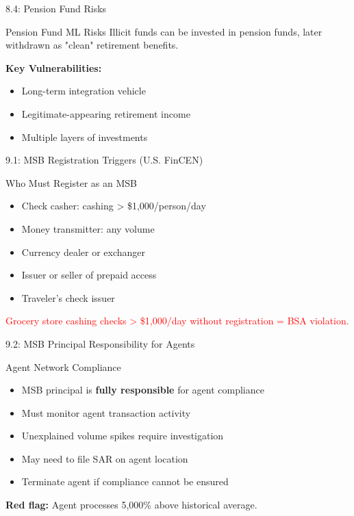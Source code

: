 \documentclass{beamer}
\begin{document}
	\begin{frame}{8.4: Pension Fund Risks}
		\begin{block}{Pension Fund ML Risks}
			Illicit funds can be invested in pension funds, later withdrawn as "clean" retirement benefits.
		\end{block}
		\textbf{Key Vulnerabilities:}
		\begin{itemize}
			\item Long-term integration vehicle
			\item Legitimate-appearing retirement income
			\item Multiple layers of investments
		\end{itemize}
	\end{frame}
	
	
	\begin{frame}{9.1: MSB Registration Triggers (U.S. FinCEN)}
		\begin{block}{Who Must Register as an MSB}
			\begin{itemize}
				\item Check casher: cashing > \$1,000/person/day
				\item Money transmitter: any volume
				\item Currency dealer or exchanger
				\item Issuer or seller of prepaid access
				\item Traveler's check issuer
			\end{itemize}
		\end{block}
		\textcolor{red}{Grocery store cashing checks > \$1,000/day without registration = BSA violation.}
	\end{frame}
	
	\begin{frame}{9.2: MSB Principal Responsibility for Agents}
		\begin{block}{Agent Network Compliance}
			\begin{itemize}
				\item MSB principal is \textbf{fully responsible} for agent compliance
				\item Must monitor agent transaction activity
				\item Unexplained volume spikes require investigation
				\item May need to file SAR on agent location
				\item Terminate agent if compliance cannot be ensured
			\end{itemize}
		\end{block}
		\textbf{Red flag:} Agent processes 5,000\% above historical average.
	\end{frame}
	
\end{document}
